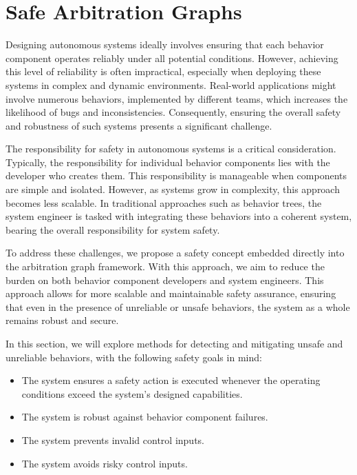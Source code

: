 \section{Safe Arbitration Graphs}

Designing autonomous systems ideally involves ensuring that each behavior component operates reliably under all potential conditions.
However, achieving this level of reliability is often impractical, especially when deploying these systems in complex and dynamic environments.
Real-world applications might involve numerous behaviors, implemented by different teams, which increases the likelihood of bugs and inconsistencies.
Consequently, ensuring the overall safety and robustness of such systems presents a significant challenge.

The responsibility for safety in autonomous systems is a critical consideration.
Typically, the responsibility for individual behavior components lies with the developer who creates them.
This responsibility is manageable when components are simple and isolated. However, as systems grow in complexity, this approach becomes less scalable.
In traditional approaches such as behavior trees, the system engineer is tasked with integrating these behaviors into a coherent system, bearing the overall responsibility for system safety.

To address these challenges, we propose a safety concept embedded directly into the arbitration graph framework.
With this approach, we aim to reduce the burden on both behavior component developers and system engineers.
This approach allows for more scalable and maintainable safety assurance, ensuring that even in the presence of unreliable or unsafe behaviors, the system as a whole remains robust and secure.

In this section, we will explore methods for detecting and mitigating unsafe and unreliable behaviors, with the following safety goals in mind:

\begin{itemize}
    \item The system ensures a safety action is executed whenever the operating conditions exceed the system's designed capabilities.
    \item The system is robust against behavior component failures.
    \item The system prevents invalid control inputs.
    \item The system avoids risky control inputs.
\end{itemize}

